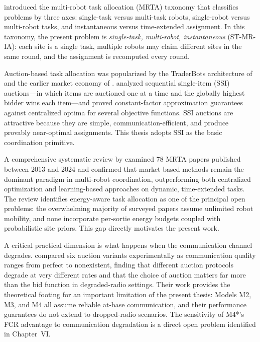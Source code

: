 \begin{doublespacing}
\citet{Gerkey2004} introduced the multi-robot
task allocation (MRTA) taxonomy that classifies problems by three
axes: single-task versus multi-task robots, single-robot versus
multi-robot tasks, and instantaneous versus time-extended assignment.
In this taxonomy, the present problem is
\emph{single-task, multi-robot, instantaneous} (ST-MR-IA): each site
is a single task, multiple robots may claim different sites in the
same round, and the assignment is recomputed every round.

Auction-based task allocation was popularized by the TraderBots
architecture of \citet{Dias2006} and the earlier market economy of
\citet{Zlot2002}. \citet{Koenig2006}
analyzed sequential single-item (SSI) auctions---in which items are
auctioned one at a time and the globally highest bidder wins each
item---and proved constant-factor approximation guarantees against
centralized optima for several objective functions. SSI auctions are
attractive because they are simple, communication-efficient, and
produce provably near-optimal assignments. This thesis adopts SSI as
the basic coordination primitive.

A comprehensive systematic review by \citet{ACMSurveyMRTA2025}
examined 78 MRTA papers published between 2013 and 2024 and confirmed
that market-based methods remain the dominant paradigm in multi-robot
coordination, outperforming both centralized optimization and
learning-based approaches on dynamic, time-extended tasks. The review
identifies energy-aware task allocation as one of the principal open
problems: the overwhelming majority of surveyed papers assume unlimited
robot mobility, and none incorporate per-sortie energy budgets coupled
with probabilistic site priors. This gap directly motivates the present
work.

A critical practical dimension is what happens when the communication
channel degrades. \citet{OtteKuhlman2020} compared six auction variants
experimentally as communication quality ranges from perfect to
nonexistent, finding that different auction protocols degrade at very
different rates and that the choice of auction matters far more than the
bid function in degraded-radio settings. Their work provides the
theoretical footing for an important limitation of the present thesis:
Models M2, M3, and M4 all assume reliable at-base communication,
and their performance guarantees do not extend to dropped-radio
scenarios. The sensitivity of M4*'s FCR advantage to communication
degradation is a direct open problem identified in Chapter~VI.


\end{doublespacing}
